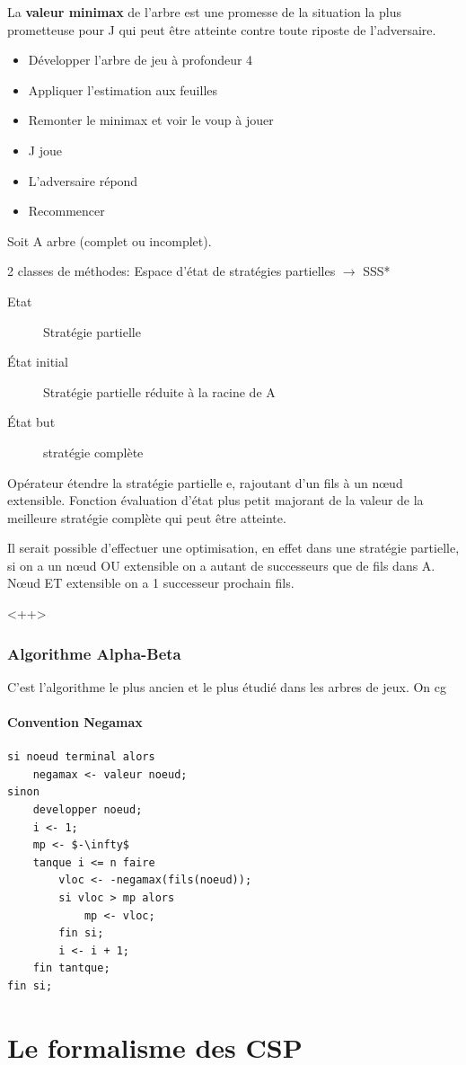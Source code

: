 \documentclass[12pt,a4paper,openany]{book}
\begin{document}
\begin{definition}
	La \textbf{valeur minimax} de l'arbre est une promesse de la situation la plus prometteuse pour J qui peut être atteinte contre toute riposte de l'adversaire.
\end{definition}

\begin{itemize}
\item Développer l'arbre de jeu à profondeur 4 
\item Appliquer l'estimation aux feuilles
\item Remonter le minimax et voir le voup à jouer
\item J joue
\item L'adversaire répond
\item Recommencer
\end{itemize}


Soit A arbre (complet ou incomplet).


2 classes de méthodes:
Espace d'état de stratégies partielles $\to$ SSS*
\begin{description}
\item [Etat] Stratégie partielle 
\item [État initial] Stratégie partielle réduite à la racine de A
\item [État but] stratégie complète
\end{description}

Opérateur étendre la stratégie partielle e, rajoutant d'un fils à un nœud extensible. 
Fonction évaluation d'état plus petit majorant de la valeur de la meilleure stratégie complète qui peut être atteinte. 

\begin{remarque}
Il serait possible d'effectuer une optimisation, en effet dans une stratégie partielle, si on a un nœud OU extensible on a autant de successeurs que de fils dans A.
Nœud ET extensible on a 1 successeur prochain fils.
\end{remarque}<++>

\subsection{Algorithme Alpha-Beta}
C'est l'algorithme le plus ancien et le plus étudié dans les arbres de jeux. On cg

\subsubsection{Convention Negamax}
\begin{lstlisting}[language=Algo]
si noeud terminal alors
	negamax <- valeur noeud;
sinon
	developper noeud;
	i <- 1;
	mp <- $-\infty$
	tanque i <= n faire
		vloc <- -negamax(fils(noeud));
		si vloc > mp alors
			mp <- vloc;
		fin si;
		i <- i + 1;
	fin tantque;
fin si;
\end{lstlisting}

	\chapter{Le formalisme des CSP}
\end{document}
